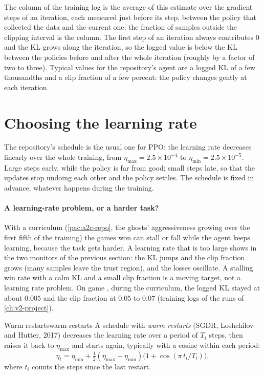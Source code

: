 The  column of the training log is the average of this estimate
over the gradient steps of an iteration, each measured just before its
step, between the policy that collected the data and the current one; the
fraction of samples outside the clipping interval is the 
column. The first step of an iteration always contributes $0$ and the KL
grows along the iteration, so the logged value is below the KL between
the policies before and after the whole iteration (roughly by a factor of
two to three). Typical values for the repository's agent are a logged KL
of a few thousandths and a clip fraction of a few percent: the policy
changes gently at each iteration.

\section{Choosing the learning rate}
\label{sec:ppo-lr}

The repository's schedule is the usual one for PPO: the learning rate
decreases linearly over the whole training, from $\eta_{\max} = 2.5 \times
10^{-4}$ to $\eta_{\min} = 2.5 \times 10^{-5}$. Large steps early, while the
policy is far from good; small steps late, so that the updates stop
undoing each other and the policy settles. The schedule is fixed in
advance, whatever happens during the training.

\paragraph{A learning-rate problem, or a harder task?} With a curriculum
(\cref{pac:a2c-repo}, the ghosts' aggressiveness growing over the first
fifth of the training) the games won can stall or fall while the agent keeps
learning, because the task gets harder. A learning rate that is too large
shows in the two monitors of the previous section: the KL jumps and the
clip fraction grows (many samples leave the trust region), and the losses
oscillate. A stalling win rate with a calm KL and a small clip fraction
is a moving target, not a learning rate problem. On game , during
the curriculum, the logged KL stayed at about $0.005$ and the clip
fraction at $0.05$ to $0.07$ (training logs of the runs of
\cref{ch:v2-project}).

\begin{definition}{Warm restarts}{warm-restarts}
  A schedule with \emph{warm restarts} (SGDR, Loshchilov and Hutter, 2017)
  decreases the learning rate over a period of $T_i$ steps, then raises it
  back to $\eta_{\max}$ and starts again, typically with a cosine within
  each period:
  \begin{equation}
    \eta_t = \eta_{\min} + \tfrac{1}{2}(\eta_{\max} - \eta_{\min})
      \bigl(1 + \cos(\pi\, t_i / T_i)\bigr),
  \end{equation}
  where $t_i$ counts the steps since the last restart.
\end{definition}

